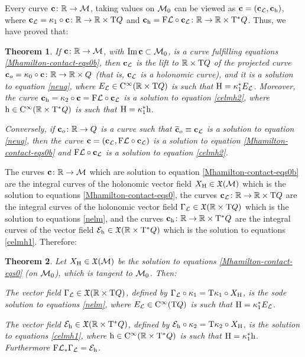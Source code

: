 \documentclass[12pt]{report}
\newtheorem{teor}{Theorem}[chapter]
\def\vf{\mathfrak X}
\def\Lag{{\cal L}}
\def\Real{\mathbb{R}}
\def\Tan{{\rm T}}
\def\Cinfty{{\rm C}^\infty}
\begin{document}
Every curve ${\bf c}\colon \Real\to{\cal M}$,
taking values on ${\cal M}_0$ can be viewed as
${\bf c}=({\bf c}_\Lag, {\bf c}_{\rm h})$, where
${\bf c}_\Lag=\kappa_1\circ{\bf c}\colon \Real \to\Real\times\Tan Q$
and ${\bf c}_{\rm h}={\rm F}\Lag\circ {\bf c}_\Lag\colon\Real\to\Real\times\Tan^*Q$.
Thus, we have proved that:

\begin{teor}
\label{eqM}
If ${\bf c}\colon\Real\to{\cal M}$,
with  ${\rm Im}\,{\bf c}\subset{\cal M}_0$,
is a curve fulfilling equations \eqref{Mhamilton-contact-eqs0b}, then
${\bf c}_\Lag$ is the lift to
$\Real\times\Tan Q$ of the projected curve
${\bf c}_o=\kappa_0\circ{\bf c}\colon\Real\to\Real\times Q$ 
(that is, ${\bf c}_\Lag$ is a holonomic curve),
and it is a solution to equation \eqref{neuq},
where $E_\Lag\in\Cinfty(\Real\times\Tan Q)$ is such that ${\rm H}=\kappa_1^*E_\Lag$.
Moreover, the curve  
${\bf c}_{\rm h}=\kappa_2\circ{\bf c}={\rm F}\Lag\circ{\bf c}_\Lag$
is a solution to equation \eqref{celmh2},
where ${\rm h}\in\Cinfty(\Real\times\Tan^*Q)$ is such that 
${\rm H}=\kappa_1^*{\rm h}$.

Conversely, if ${\bf c}_o\colon\Real\to Q$ is a curve such that
$\widetilde {\bf c}_o\equiv{\bf c}_\Lag$ is a solution to equation \eqref{neuq}, then the curve
${\bf c}=({\bf c}_\Lag,{\rm F}\Lag\circ{\bf c}_\Lag)$
is a solution to equation \eqref{Mhamilton-contact-eqs0b}
and ${\rm F}\Lag\circ{\bf c}_\Lag$
is a solution to equation \eqref{celmh2}.
\end{teor}

The curves ${\bf c}\colon\Real\to{\cal M}$ which are
solution to equation \eqref{Mhamilton-contact-eqs0b}
are the integral curves of the holonomic vector field $X_{\rm H}\in\vf({\cal M})$ 
which is the solution to equations \eqref{Mhamilton-contact-eqs0},
the curves ${\bf c}_\Lag\colon\Real\to\Real\times\Tan Q$
are the integral curves of the holonomic vector field 
$\Gamma_\Lag\in\vf(\Real\times\Tan Q)$ which is the
solution to equations \eqref{nelm}, and  the curves ${\bf c}_{\rm h}\colon\Real\to\Real\times\Tan^*Q$
are the integral curves of the vector field ${\cal E}_{\rm h}\in\vf(\Real\times\Tan^*Q)$ which is the
solution to equations  \eqref{celmh1}.
Therefore:

\begin{teor}
\label{eqL2}
Let $X_{\rm H}\in\vf({\cal M})$ be the solution to equations \eqref{Mhamilton-contact-eqs0} (on ${\cal M}_0$),
which is tangent to  ${\cal M}_0$.  Then:

The vector field $\Gamma_\Lag\in\vf(\Real\times\Tan Q)$, defined by
$\Gamma_\Lag\circ\kappa_1=\Tan\kappa_1\circ X_{\rm H}$,
is the {\sc sode} solution to equations \eqref{nelm},
where $E_\Lag\in\Cinfty(\Tan Q)$ is such that ${\rm H}=\kappa_1^*E_\Lag$.

The vector field ${\cal E}_{\rm h}\in\vf(\Real\times\Tan^*Q)$, defined by
${\cal E}_{\rm h}\circ\kappa_2=\Tan\kappa_2\circ X_{\rm H}$,
is the solution to equations \eqref{celmh1},
where ${\rm h}\in\Cinfty(\Real\times\Tan^*Q)$ is such that 
${\rm H}=\kappa_1^*{\rm h}$.
Furthermore ${\rm F}\Lag_*\Gamma_\Lag={\cal E}_{\rm h}$.
\end{teor}
\end{document}
